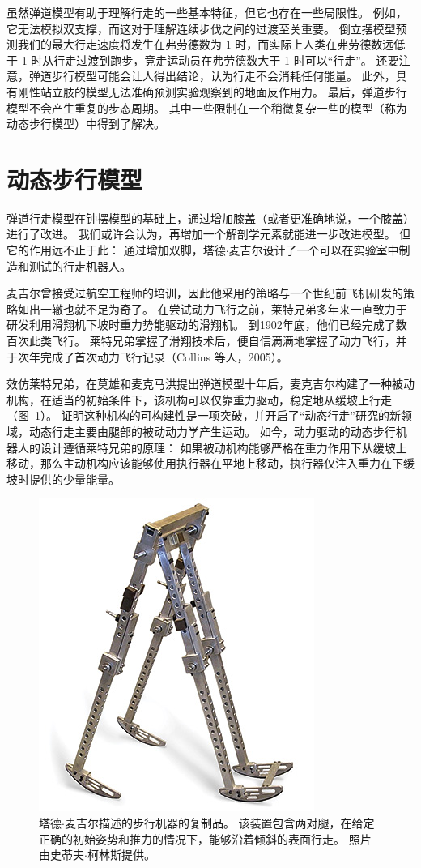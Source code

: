 虽然弹道模型有助于理解行走的一些基本特征，但它也存在一些局限性。
例如，它无法模拟双支撑，而这对于理解连续步伐之间的过渡至关重要。
倒立摆模型预测我们的最大行走速度将发生在弗劳德数为 1 时，而实际上人类在弗劳德数远低于 1 时从行走过渡到跑步，竞走运动员在弗劳德数大于 1 时可以“行走”。
还要注意，弹道步行模型可能会让人得出结论，认为行走不会消耗任何能量。
此外，具有刚性站立肢的模型无法准确预测实验观察到的地面反作用力。
最后，弹道步行模型不会产生重复的步态周期。
其中一些限制在一个稍微复杂一些的模型（称为动态步行模型）中得到了解决。


\section{动态步行模型}

弹道行走模型在钟摆模型的基础上，通过增加膝盖（或者更准确地说，一个膝盖）进行了改进。
我们或许会认为，再增加一个解剖学元素就能进一步改进模型。
但它的作用远不止于此：
通过增加双脚，塔德$\cdot$麦吉尔设计了一个可以在实验室中制造和测试的行走机器人。


麦吉尔曾接受过航空工程师的培训，因此他采用的策略与一个世纪前飞机研发的策略如出一辙也就不足为奇了。
在尝试动力飞行之前，莱特兄弟多年来一直致力于研发利用滑翔机下坡时重力势能驱动的滑翔机。
到1902年底，他们已经完成了数百次此类飞行。
莱特兄弟掌握了滑翔技术后，便自信满满地掌握了动力飞行，并于次年完成了首次动力飞行记录（Collins 等人，2005）。


效仿莱特兄弟，在莫雄和麦克马洪提出弹道模型十年后，麦克吉尔构建了一种被动机构，在适当的初始条件下，该机构可以仅靠重力驱动，稳定地从缓坡上行走（图~\ref{fig:2_13}）。
证明这种机构的可构建性是一项突破，并开启了“动态行走”研究的新领域，动态行走主要由腿部的被动动力学产生运动。
如今，动力驱动的动态步行机器人的设计遵循莱特兄弟的原理：
如果被动机构能够严格在重力作用下从缓坡上移动，那么主动机构应该能够使用执行器在平地上移动，执行器仅注入重力在下缓坡时提供的少量能量。


\begin{figure}[!htb]
	\centering
	\includegraphics[width=0.6\linewidth]{chap2/2_13}
	\caption{塔德$\cdot$麦吉尔\cite{mcgeer1990passive}描述的步行机器的复制品。
		该装置包含两对腿，在给定正确的初始姿势和推力的情况下，能够沿着倾斜的表面行走。
		照片由史蒂夫$\cdot$柯林斯提供。 \label{fig:2_13}}
\end{figure}



